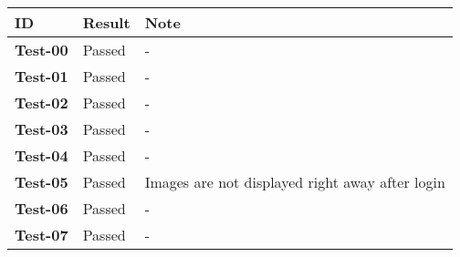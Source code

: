 \documentclass[../documentation.tex]{subfiles}
\begin{document}
\bgroup{}
\def\arraystretch{1.25}
\begin{center}
    \begin{tabular}{ |l|l|l| }
        \hline
        \textbf{ID} & Result & Note \\
        \hline
        \textbf{Test-00} & \color{darkgreen} Passed & - \\
        \hline
        \textbf{Test-01} & \color{darkgreen} Passed & - \\
        \hline
        \textbf{Test-02} & \color{darkgreen} Passed & - \\
        \hline
        \textbf{Test-03} & \color{darkgreen} Passed & - \\
        \hline
        \textbf{Test-04} & \color{darkgreen} Passed & - \\
        \hline
        \textbf{Test-05} & \color{darkgreen} Passed & Images are not displayed right away after login \\
        \hline
        \textbf{Test-06} & \color{darkgreen} Passed & - \\
        \hline
        \textbf{Test-07} & \color{darkgreen} Passed & - \\
        \hline
    \end{tabular}
\end{center}
\egroup{}
\end{document}
